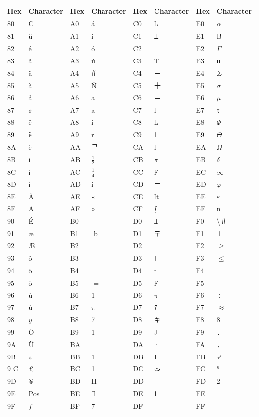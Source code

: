 \documentclass[10pt]{article}
\begin{document}
\begin{center}
\begin{tabular}{|l|l|l|l|l|l|l|l|}
\hline
Hex & Character & Hex & Character & Hex & Character & Hex & Character \\
\hline
80 & C & A0 & á & C0 & L & E0 & $\alpha$ \\
\hline
81 & ü & A1 & í & C1 & ⟂ & E1 & B \\
\hline
82 & é & A2 & ó & C2 &  & E2 & $\Gamma$ \\
\hline
83 & â & A3 & ú & C3 & T & E3 & п \\
\hline
84 & ä & A4 & กั & C4 & － & E4 & $\Sigma$ \\
\hline
85 & à & A5 & Ñ & C5 & 十 & E5 & $\sigma$ \\
\hline
86 & å & A6 & a & C6 & ＝ & E6 & $\mu$ \\
\hline
87 & ¢ & A7 & a & C7 & I & E7 & τ \\
\hline
88 & ê & A8 & i & C8 & L & E8 & $\Phi$ \\
\hline
89 & ё & A9 & r & C9 & $\mathbb{I}$ & E9 & $\Theta$ \\
\hline
8A & è & AA & ᄀ & CA & I & EA & $\Omega$ \\
\hline
8B & i & AB & $\frac{1}{2}$ & CB & $\bar{\pi}$ & EB & $\delta$ \\
\hline
8C & î & AC & $\frac{1}{4}$ & CC & F & EC & $\infty$ \\
\hline
8D & ì & AD & i & CD & ＝ & ED & $\varphi$ \\
\hline
8E & Ä & AE & « & CE & It & EE & $\varepsilon$ \\
\hline
8F & A & AF & » & CF & $\underline{I}$ & EF & n \\
\hline
90 & É & B0 &  & D0 & ⫫ & F0 & \textbackslash ＃ \\
\hline
91 & æ & B1 & $\overline{\text { b }}$ & D1 & 〒 & F1 & ± \\
\hline
92 & Æ & B2 &  & D2 &  & F2 & $\geq$ \\
\hline
93 & ô & B3 &  & D3 & $\mathbb{I}$ & F3 & $\leq$ \\
\hline
94 & ö & B4 &  & D4 & t & F4 &  \\
\hline
95 & ò & B5 & $=$ & D5 & F & F5 &  \\
\hline
96 & û & B6 & 1 & D6 & $\pi$ & F6 & $\div$ \\
\hline
97 & ù & B7 & $\pi$ & D7 & 7 & F7 & $\approx$ \\
\hline
98 & $\ddot{y}$ & B8 & 7 & D8 & キ & F8 & 8 \\
\hline
99 & Ö & B9 & 1 & D9 & J & F9 & ． \\
\hline
9A & Ü & BA &  & DA & г & FA & ． \\
\hline
9B & ¢ & BB & 1 & DB & 1 & FB & ✓ \\
\hline
9 C & £ & BC & 1 & DC & ت & FC & ${ }^{n}$ \\
\hline
9D & ¥ & BD & II & DD &  & FD & 2 \\
\hline
9E & Pos & BE & $\exists$ & DE & 1 & FE & － \\
\hline
9F & $f$ & BF & 7 & DF &  & FF &  \\
\hline
\end{tabular}
\end{center}
\end{document}
